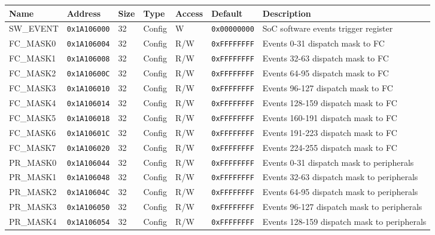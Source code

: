 {\small
\begin{tabularx}{\textwidth}{|l|l|l|l|l|l|X|}
  \hline
  \textbf{Name} & \textbf{Address}  & \textbf{Size} & \textbf{Type} & \textbf{Access} & \textbf{Default} & \textbf{Description} \\
  \hline
  SW\_EVENT & \texttt{0x1A106000} & 32 & Config & W      & \texttt{0x00000000} & SoC software events trigger register \\
  \hline
  FC\_MASK0 & \texttt{0x1A106004} & 32 & Config & R/W    & \texttt{0xFFFFFFFF} & Events 0-31 dispatch mask to FC \\
  \hline
  FC\_MASK1 & \texttt{0x1A106008} & 32 & Config & R/W    & \texttt{0xFFFFFFFF} & Events 32-63 dispatch mask to FC \\
  \hline
  FC\_MASK2 & \texttt{0x1A10600C} & 32 & Config & R/W    & \texttt{0xFFFFFFFF} & Events 64-95 dispatch mask to FC \\
  \hline
  FC\_MASK3 & \texttt{0x1A106010} & 32 & Config & R/W    & \texttt{0xFFFFFFFF} & Events 96-127 dispatch mask to FC \\
  \hline
  FC\_MASK4 & \texttt{0x1A106014} & 32 & Config & R/W    & \texttt{0xFFFFFFFF} & Events 128-159 dispatch mask to FC \\
  \hline
  FC\_MASK5 & \texttt{0x1A106018} & 32 & Config & R/W    & \texttt{0xFFFFFFFF} & Events 160-191 dispatch mask to FC \\
  \hline
  FC\_MASK6 & \texttt{0x1A10601C} & 32 & Config & R/W    & \texttt{0xFFFFFFFF} & Events 191-223 dispatch mask to FC \\
  \hline
  FC\_MASK7 & \texttt{0x1A106020} & 32 & Config & R/W    & \texttt{0xFFFFFFFF} & Events 224-255 dispatch mask to FC \\
  \hline
  PR\_MASK0 & \texttt{0x1A106044} & 32 & Config & R/W    & \texttt{0xFFFFFFFF} & Events 0-31 dispatch mask to peripherals \\
  \hline
  PR\_MASK1 & \texttt{0x1A106048} & 32 & Config & R/W    & \texttt{0xFFFFFFFF} & Events 32-63 dispatch mask to peripherals \\
  \hline
  PR\_MASK2 & \texttt{0x1A10604C} & 32 & Config & R/W    & \texttt{0xFFFFFFFF} & Events 64-95 dispatch mask to peripherals \\
  \hline
  PR\_MASK3 & \texttt{0x1A106050} & 32 & Config & R/W    & \texttt{0xFFFFFFFF} & Events 96-127 dispatch mask to peripherals \\
  \hline
  PR\_MASK4 & \texttt{0x1A106054} & 32 & Config & R/W    & \texttt{0xFFFFFFFF} & Events 128-159 dispatch mask to peripherals \\

\end{tabularx}}
